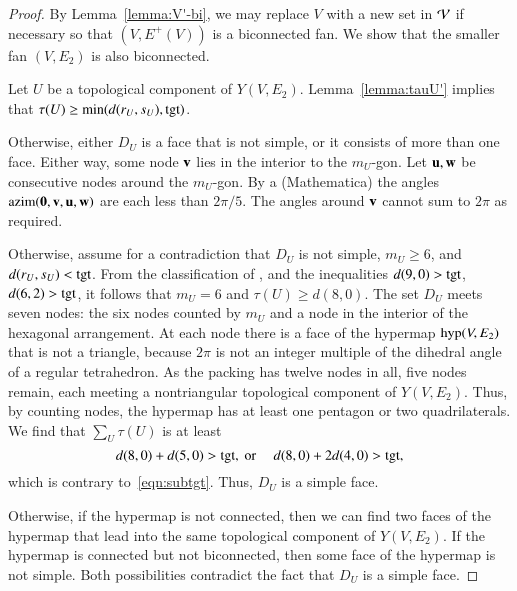 \documentclass{llncs}
\def\op#1{{\hbox{#1}}}
\begin{document}
\begin{proof}
  By Lemma~\ref{lemma:V'-bi}, we may replace $V$ with a new set in
  ${\mathcal V}$ if necessary so that $(V,E^+(V))$ is a biconnected fan.
   We  show that the smaller
  fan $(V,E_{2})$ is also biconnected.

  Let $U$ be a topological component of $Y(V,E_{2})$.  Lemma~\ref{lemma:tauU'}
   implies that $\tau(U)\ge \min(d(r_U,s_U),\op{tgt})$.

    Otherwise,
   either $D_U$ is a face that is not simple, or it consists of more than
   one face.  Either way, some node ${\mathbf v}$ lies in the interior to the
   $m_U$-gon.  Let ${\mathbf u},{\mathbf w}$ be consecutive nodes around the $m_U$-gon.
   By a %
  {(Mathematica)} the angles
   $\op{azim}(\orz,\v,\u,\w)$ are each less than $2\pi/5$. The angles
   around ${\mathbf v}$ cannot sum to $2\pi$ as required.

     Otherwise, assume
   for a contradiction that $D_U$ is not simple, $m_U\ge 6$, and
   $d(r_U,s_U)<\op{tgt}$.  From the classification of
   \cite[p.~126,~Fig.~12.1]{Hales:2006:DCG}, and the inequalities
   $d(9,0) > \op{tgt}$, $d(6,2) > \op{tgt}$, it follows that 
    $m_U=6$ and $\tau(U)\ge d(8,0)$.  The set $D_U$ meets seven
   nodes: the six nodes counted by $m_U$ and a node in the interior of
   the hexagonal arrangement.  At each node there is a face of the
   hypermap $\op{hyp}(V,E_{2})$ that is not a triangle, because
   $2\pi$ is not an integer multiple of the dihedral angle of a
   regular tetrahedron.  As the packing has twelve nodes in all, five
   nodes remain, each meeting a nontriangular topological component of
   $Y(V,E_{2})$.  Thus, by counting nodes, the hypermap has at least
   one pentagon or two quadrilaterals.  We find that $\sum_{U}
   \tau(U)$ is at least
\[
d(8,0) + d(5,0) > \op{tgt}, \text{ or }\quad d(8,0) + 2 d(4,0) > \op{tgt},
\]
which is contrary to~\eqref{eqn:subtgt}.
Thus, $D_U$ is a simple face.
%
%

  Otherwise, if the hypermap is
not connected, then we can find two faces of the hypermap that lead
into the same topological component of $Y(V,E_{2})$.  If the
hypermap is connected but not biconnected, then some face of the
hypermap is not simple.  Both possibilities contradict the fact that
$D_U$ is a simple face.
\end{proof}
\end{document}
